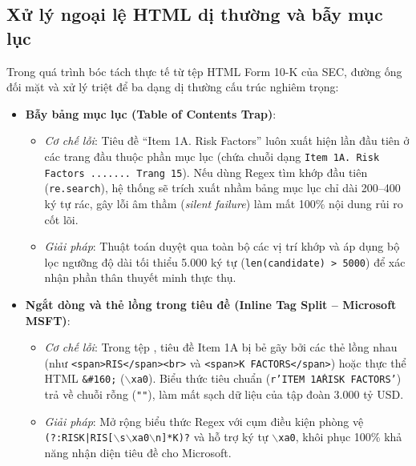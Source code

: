 \subsection{Xử lý ngoại lệ HTML dị thường và bẫy mục lục}
Trong quá trình bóc tách thực tế từ tệp HTML Form 10-K của SEC, đường ống đối mặt và xử lý triệt để ba dạng dị thường cấu trúc nghiêm trọng:

\begin{itemize}
    \item \textbf{Bẫy bảng mục lục (Table of Contents Trap)}:
    \begin{itemize}
        \item \textit{Cơ chế lỗi}: Tiêu đề ``Item 1A. Risk Factors'' luôn xuất hiện lần đầu tiên ở các trang đầu thuộc phần mục lục (chứa chuỗi dạng \texttt{Item 1A. Risk Factors ....... Trang 15}). Nếu dùng Regex tìm khớp đầu tiên (\texttt{re.search}), hệ thống sẽ trích xuất nhầm bảng mục lục chỉ dài 200--400 ký tự rác, gây lỗi âm thầm (\textit{silent failure}) làm mất 100\% nội dung rủi ro cốt lõi.
        \item \textit{Giải pháp}: Thuật toán duyệt qua toàn bộ các vị trí khớp và áp dụng bộ lọc ngưỡng độ dài tối thiểu 5.000 ký tự (\texttt{len(candidate) > 5000}) để xác nhận phần thân thuyết minh thực thụ.
    \end{itemize}
    
    \item \textbf{Ngắt dòng và thẻ lồng trong tiêu đề (Inline Tag Split -- Microsoft MSFT)}:
    \begin{itemize}
        \item \textit{Cơ chế lỗi}: Trong tệp , tiêu đề Item 1A bị bẻ gãy bởi các thẻ lồng nhau (như \texttt{<span>RIS</span><br>} và \texttt{<span>K FACTORS</span>}) hoặc thực thể HTML \texttt{\&\#160;} (\texttt{$\backslash$xa0}). Biểu thức tiêu chuẩn (\texttt{r'ITEM 1A\. RISK FACTORS'}) trả về chuỗi rỗng (\texttt{""}), làm mất sạch dữ liệu của tập đoàn 3.000 tỷ USD.
        \item \textit{Giải pháp}: Mở rộng biểu thức Regex với cụm điều kiện phòng vệ \texttt{(?:RISK|RIS[$\backslash$s$\backslash$xa0$\backslash$n]*K)?} và hỗ trợ ký tự \texttt{$\backslash$xa0}, khôi phục 100\% khả năng nhận diện tiêu đề cho Microsoft.
    \end{itemize}
    

\end{itemize}

